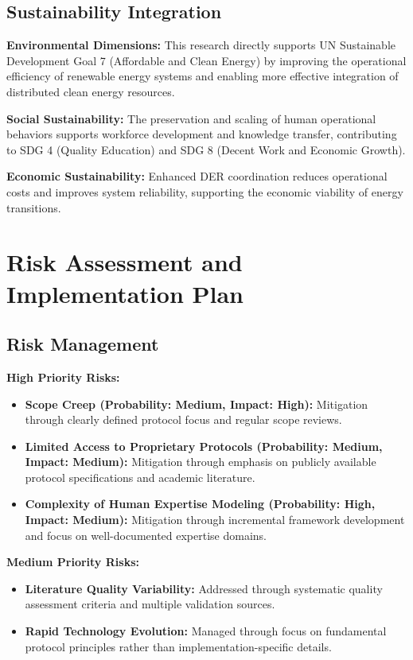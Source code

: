 \documentclass[12pt,a4paper]{article}
\begin{document}
\subsection{Sustainability Integration}

\noindent \textbf{Environmental Dimensions:} This research directly supports UN Sustainable Development Goal 7 (Affordable and Clean Energy) by improving the operational efficiency of renewable energy systems and enabling more effective integration of distributed clean energy resources.

\noindent \textbf{Social Sustainability:} The preservation and scaling of human operational behaviors supports workforce development and knowledge transfer, contributing to SDG 4 (Quality Education) and SDG 8 (Decent Work and Economic Growth).

\noindent \textbf{Economic Sustainability:} Enhanced DER coordination reduces operational costs and improves system reliability, supporting the economic viability of energy transitions.

\section{Risk Assessment and Implementation Plan}
\label{sec:risks}

\subsection{Risk Management}

\noindent \textbf{High Priority Risks:}
\begin{itemize}
\item \textbf{Scope Creep (Probability: Medium, Impact: High):} Mitigation through clearly defined protocol focus and regular scope reviews.
\item \textbf{Limited Access to Proprietary Protocols (Probability: Medium, Impact: Medium):} Mitigation through emphasis on publicly available protocol specifications and academic literature.
\item \textbf{Complexity of Human Expertise Modeling (Probability: High, Impact: Medium):} Mitigation through incremental framework development and focus on well-documented expertise domains.
\end{itemize}

\noindent \textbf{Medium Priority Risks:}
\begin{itemize}
\item \textbf{Literature Quality Variability:} Addressed through systematic quality assessment criteria and multiple validation sources.
\item \textbf{Rapid Technology Evolution:} Managed through focus on fundamental protocol principles rather than implementation-specific details.
\end{itemize}
\end{document}
